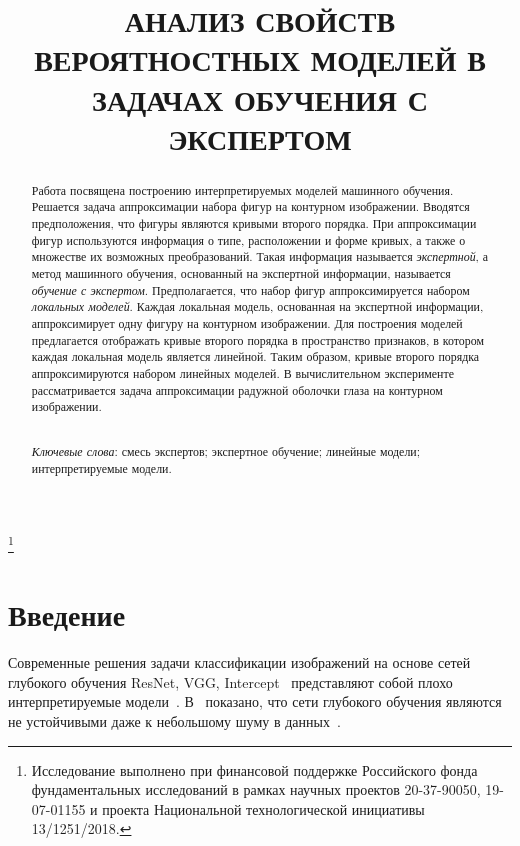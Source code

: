 \documentclass[12pt]{a&t}
\begin{document}

\title{АНАЛИЗ СВОЙСТВ ВЕРОЯТНОСТНЫХ МОДЕЛЕЙ В ЗАДАЧАХ ОБУЧЕНИЯ С ЭКСПЕРТОМ}%
\thanks{Исследование выполнено при финансовой поддержке Российского фонда фундаментальных исследований в рамках научных проектов 20-37-90050, 19-07-01155 и проекта Национальной технологической инициативы 13/1251/2018.}



\maketitle

\begin{abstract}
Работа посвящена построению интерпретируемых моделей машинного обучения.
Решается задача аппроксимации набора фигур на контурном изображении.
Вводятся предположения, что фигуры являются кривыми второго порядка.
При аппроксимации фигур используются информация о типе, расположении и форме кривых, а также о множестве их возможных преобразований.
Такая информация называется \textit{экспертной}, а метод машинного обучения, основанный на экспертной информации, называется \textit{обучение с экспертом}.
Предполагается, что набор фигур аппроксимируется набором \textit{локальных моделей}.
Каждая локальная модель, основанная на экспертной информации, аппроксимирует одну фигуру на контурном изображении.
Для построения моделей предлагается отображать кривые второго порядка в пространство признаков, в котором каждая локальная модель является линейной.
Таким образом, кривые второго порядка аппроксимируются набором линейных моделей.
В вычислительном эксперименте рассматривается задача аппроксимации радужной оболочки глаза на контурном изображении.

\smallskip\\
\textit{Ключевые слова}: смесь экспертов; экспертное обучение; линейные модели; интерпретируемые модели.
\end{abstract}

\section{Введение}
Современные решения задачи классификации изображений на основе сетей глубокого обучения ResNet, VGG, Intercept~\cite{Kaiming2015} представляют собой плохо интерпретируемые модели~\cite{Ribeiro2016}.
В~\cite{Han2020, Akhtar2018} показано, что сети глубокого обучения являются не устойчивыми даже к небольшому шуму в данных~\cite{Grabovoy2022ait}.
\end{document}
